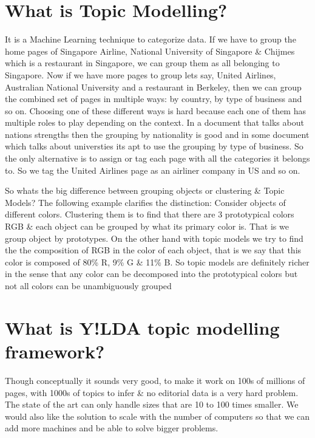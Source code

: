 \section*{What is Topic Modelling?}

It is a Machine Learning technique to categorize data. If we have to group the home pages of Singapore Airline, National University of Singapore \& Chijmes which is a restaurant in Singapore, we can group them as all belonging to Singapore. Now if we have more pages to group lets say, United Airlines, Australian National University and a restaurant in Berkeley, then we can group the combined set of pages in multiple ways: by country, by type of business and so on. Choosing one of these different ways is hard because each one of them has multiple roles to play depending on the context. In a document that talks about nations strengths then the grouping by nationality is good and in some document which talks about universties its apt to use the grouping by type of business. So the only alternative is to assign or tag each page with all the categories it belongs to. So we tag the United Airlines page as an airliner company in US and so on.

So whats the big difference between grouping objects or clustering \& Topic Models? The following example clarifies the distinction: Consider objects of different colors. Clustering them is to find that there are 3 prototypical colors RGB \& each object can be grouped by what its primary color is. That is we group object by prototypes. On the other hand with topic models we try to find the the composition of RGB in the color of each object, that is we say that this color is composed of 80\% R, 9\% G \& 11\% B. So topic models are definitely richer in the sense that any color can be decomposed into the prototypical colors but not all colors can be unambiguously grouped

\section*{What is Y!LDA topic modelling framework?}

Though conceptually it sounds very good, to make it work on 100s of millions of pages, with 1000s of topics to infer \& no editorial data is a very hard problem. The state of the art can only handle sizes that are 10 to 100 times smaller. We would also like the solution to scale with the number of computers so that we can add more machines and be able to solve bigger problems.

